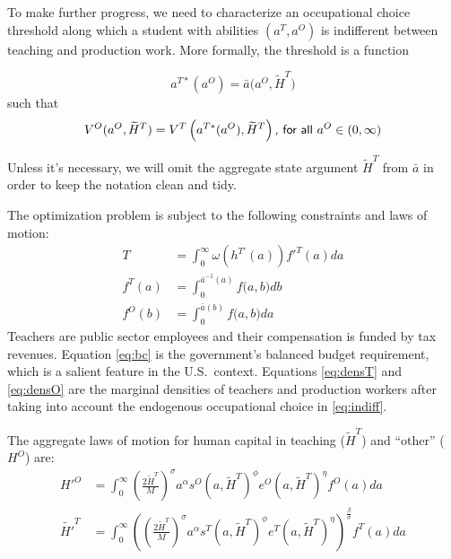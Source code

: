\documentclass[onehalfspacing,11pt]{article}
\begin{document}
To make further progress, we need to characterize an occupational choice threshold along which a student with abilities $(a^T,a^O)$ is indifferent between teaching and production work. More formally, the threshold is a function

\begin{equation*}
a^{T*}(a^O) = \bar{a}\big(a^{O},\widetilde{H}^T\big) %
\end{equation*}
such that
\begin{equation}
\label{eq:indiff}
V^{O}(a^{O},\widetilde{H}^T) = V^{T}\left(a^{T*}(a^O),\widetilde{H}^T\right) \textrm{{\sf , for all} } a^O \in (0,\infty)
\end{equation}

Unless it's necessary, we will omit the aggregate state argument $\widetilde{H}^T$ from $\bar{a}$ in order to keep the notation clean and tidy.

The optimization problem is subject to the following constraints and laws of motion:
\begin{align}
\label{eq:bc}
T & = \int_0^\infty \omega\left(h^{T'}(a)\right) {f'}^T(a) da \\%
\label{eq:densT}
f^T(a) & = \int_0^{\bar{a}^{-1}\left(a\right)} f\big(a,b \big) db \\
\label{eq:densO}
f^O(b) & = \int_0^{\bar{a}\left(b\right)} f\big(a,b \big) da 
\end{align}
Teachers are public sector employees and their compensation is funded by tax revenues. Equation \eqref{eq:bc} is the government's balanced budget requirement, which is a salient feature in the U.S.~context. Equations \eqref{eq:densT} and \eqref{eq:densO} are the marginal densities of teachers and production workers after taking into account the endogenous occupational choice in \eqref{eq:indiff}.

The aggregate laws of motion for human capital in teaching ($\widetilde{H}^T$) and ``other'' (${H}^O$) are:
\begin{align}
\label{eq:lomO}
{H'}^{O} & = \int_0^\infty \left(\tfrac{2 \widetilde{H}^T}{M}\right)^\sigma a^\alpha s^O\left(a,\widetilde{H}^T\right)^\phi e^O(a,\widetilde{H}^T)^\eta  f^O(a) da \\
\label{eq:lomT}
\widetilde{H'}^{T} & = \int_0^\infty \left(\left(\tfrac{2 \widetilde{H}^T}{M}\right)^\sigma a^\alpha s^T\left(a,\widetilde{H}^T\right)^\phi e^T(a,\widetilde{H}^T)^\eta \right)^{\frac{\beta}{\sigma}} f^T(a) da 
\end{align}
\end{document}
